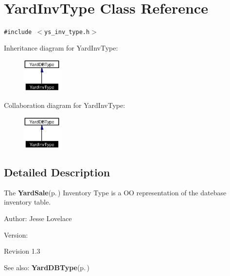 \section{Yard\-Inv\-Type Class Reference}
\label{classYardInvType}
{\tt \#include $<$ys\_\-inv\_\-type.h$>$}

Inheritance diagram for Yard\-Inv\-Type:\begin{figure}[H]
\begin{center}
\leavevmode
\includegraphics[width=57pt]{classYardInvType__inherit__graph}
\end{center}
\end{figure}
Collaboration diagram for Yard\-Inv\-Type:\begin{figure}[H]
\begin{center}
\leavevmode
\includegraphics[width=57pt]{classYardInvType__coll__graph}
\end{center}
\end{figure}


\subsection{Detailed Description}
The {\bf Yard\-Sale}{\rm (p.\,\pageref{classYardSale})} Inventory Type is a OO representation of the datebase inventory table. 

\begin{Desc}
\item[Author:]Jesse Lovelace \end{Desc}
\begin{Desc}
\item[Version:]\begin{Desc}
\item[Revision]1.3 \end{Desc}
\end{Desc}
\begin{Desc}
\item[See also:]{\bf Yard\-DBType}{\rm (p.\,\pageref{classYardDBType})} \end{Desc}


